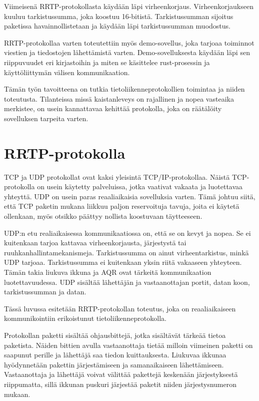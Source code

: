 \documentclass[a4paper,12pt]{article}
\begin{document}
    Viimeisenä RRTP-protokollasta käydään läpi virheenkorjaus. Virheenkorjaukseen kuuluu tarkistussumma, joka koostuu 16-bitistä. Tarkistussumman sijoitus paketissa havainnollistetaan ja käydään läpi
    tarkistussumman muodostus.\par

    RRTP-protokollaa varten toteutettiin myös demo-sovellus, joka tarjoaa 
    toiminnot viestien ja tiedostojen lähettämistä varten. Demo-sovelluksesta käydään 
    läpi sen riippuvuudet eri kirjastoihin ja miten se käsittelee rust-prosessin ja 
    käyttöliittymän välisen kommunikaation. \par

    Tämän työn tavoitteena on tutkia tietoliikenneprotokollien toimintaa ja niiden toteutusta. Tilanteissa missä kaistanleveys on rajallinen ja nopea vasteaika merkistee, on usein kannattavaa kehittää protokolla, joka on räätälöity sovelluksen tarpeita varten.

   \section{RRTP-protokolla}\label{sec:protocol}
    TCP ja UDP protokollat ovat kaksi yleisintä TCP/IP-protokollaa.
    Näistä TCP-protokolla on usein käytetty palveluissa, jotka vaativat vakaata ja luotettavaa yhteyttä. UDP on usein paras reaaliaikaisia sovelluksia varten. Tämä johtuu siitä, että TCP paketin mukana liikkuu paljon reservoituja tavuja, joita ei käytetä ollenkaan, myös otsikko päättyy nollista koostuvaan täytteeseen.\par
    
    UDP:n etu realiaikaisessa kommunikaatiossa on, että se on kevyt ja nopea. Se ei kuitenkaan tarjoa kattavaa virheenkorjausta, järjestystä tai ruuhkanhallintamekanismeja. Tarkistussumma on ainut virheentarkistus, minkä UDP tarjoaa. Tarkistussumma ei kuitenkaan yksin riitä vakaaseen yhteyteen. Tämän takia liukuva ikkuna ja AQR ovat tärkeitä kommunikaation luotettavuudessa. UDP sisältää
    lähettäjän ja vastaanottajan portit, datan koon, tarkistussumman ja datan.
    \cite{KumarSurveyUDP}
    \par
   
    Tässä luvussa esitetään RRTP-protokollan toteutus, joka on reaaliaikaiseen kommunikointiin erikoistunut tietoliikenneprotokolla.\par

    Protokollan paketti sisältää ohjausbittejä, jotka sisältävät tärkeää tietoa paketista. Näiden bittien avulla vastaanottaja tietää milloin viimeinen paketti on saapunut perille ja lähettäjä saa tiedon kuittauksesta. 
    Liukuvaa ikkunaa hyödynnetään pakettin järjestämiseen ja samanaikaiseen lähettämiseen.
    Vastaanottaja ja lähettäjä voivat välittää pakettejä keskenään järjestyksestä riippumatta, sillä ikkunan puskuri järjestää paketit niiden järjestysnumeron mukaan.
\end{document}
